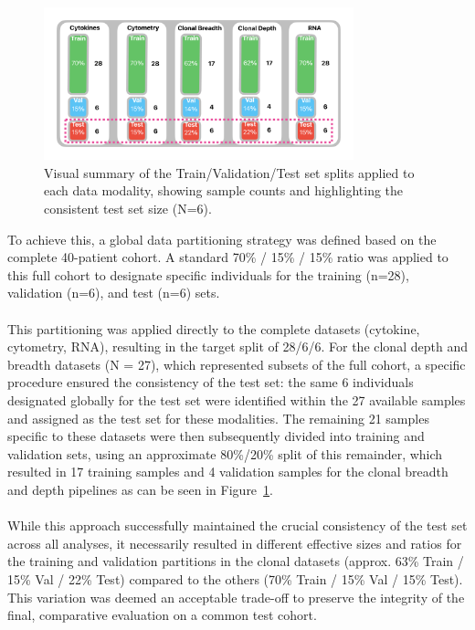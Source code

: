 \documentclass[12pt,a4paper]{report}
\begin{document}
\begin{figure}[H]
  \centering
  \includegraphics[width=0.8\textwidth]{images/split-1.png}
    \caption[Data splits per modality]{Visual summary of the Train/Validation/Test set splits applied to each data modality, showing sample counts and highlighting the consistent test set size (N=6).}
  \label{fig:split_data}
\end{figure}
\noindent
To achieve this, a global data partitioning strategy was defined based on the complete 40-patient cohort. A standard 70\% / 15\% / 15\% ratio was applied to this full cohort to designate specific individuals for the training (n=28), validation (n=6), and test (n=6) sets.\\
\\
This partitioning was applied directly to the complete datasets (cytokine, cytometry, RNA), resulting in the target split of 28/6/6. For the clonal depth and breadth datasets (N = 27), which represented subsets of the full cohort, a specific procedure ensured the consistency of the test set: the same 6 individuals designated globally for the test set were identified within the 27 available samples and assigned as the test set for these modalities. The remaining 21 samples specific to these datasets were then subsequently divided into training and validation sets, using an approximate 80\%/20\% split of this remainder, which resulted in 17 training samples and 4 validation samples for the clonal breadth and depth pipelines as can be seen in Figure~\ref{fig:split_data}.\\
\\
While this approach successfully maintained the crucial consistency of the test set across all analyses, it necessarily resulted in different effective sizes and ratios for the training and validation partitions in the clonal datasets (approx. 63\% Train / 15\% Val / 22\% Test) compared to the others (70\% Train / 15\% Val / 15\% Test). This variation was deemed an acceptable trade-off to preserve the integrity of the final, comparative evaluation on a common test cohort.
\end{document}
